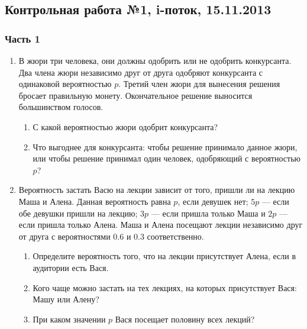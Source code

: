 \documentclass[12pt, a4paper]{article}\usepackage[]{graphicx}\usepackage[]{color}
\begin{document}
				\subsection{Контрольная работа №1, i-поток, 15.11.2013}

				\subsubsection*{Часть 1}

				\begin{enumerate}

					\item В жюри три человека, они должны одобрить или не одобрить конкурсанта. Два члена жюри независимо друг от друга одобряют конкурсанта с одинаковой вероятностью $p$. Третий член жюри  для вынесения решения бросает правильную монету. Окончательное решение выносится большинством голосов.
					\begin{enumerate}
						\item С какой вероятностью жюри одобрит конкурсанта?
						\item Что выгоднее для  конкурсанта: чтобы решение принимало данное жюри, или чтобы решение принимал один человек, одобряющий с вероятностью $p$?
					\end{enumerate}


					\item Вероятность застать Васю на лекции зависит от того, пришли ли на лекцию Маша и Алена. Данная вероятность равна $p$, если девушек нет; $5p$ — если обе девушки пришли на лекцию; $3p$ — если пришла только Маша и $2p$ — если пришла только Алена. Маша и Алена посещают лекции независимо друг от друга с вероятностями $0.6$ и $0.3$ соответственно.
					\begin{enumerate}
						\item Определите вероятность того, что на лекции присутствует Алена, если в аудитории есть Вася.
						\item Кого чаще можно застать на тех лекциях, на которых присутствует Вася: Машу или Алену?
						\item При каком значении $p$ Вася посещает половину всех лекций?
					\end{enumerate}


\end{enumerate}
\end{document}
